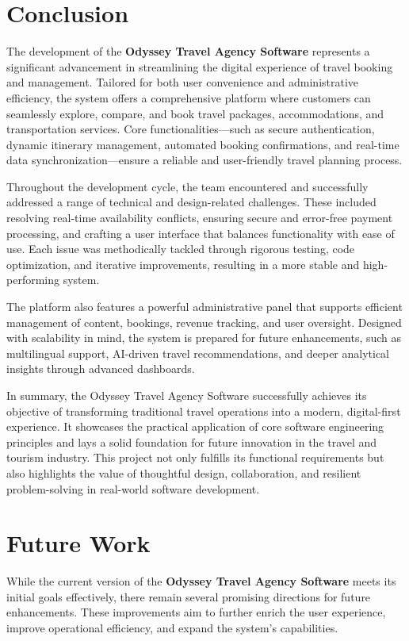 \section{Conclusion}
The development of the \textbf{Odyssey Travel Agency Software} represents a significant advancement in streamlining the digital experience of travel booking and management. Tailored for both user convenience and administrative efficiency, the system offers a comprehensive platform where customers can seamlessly explore, compare, and book travel packages, accommodations, and transportation services. Core functionalities—such as secure authentication, dynamic itinerary management, automated booking confirmations, and real-time data synchronization—ensure a reliable and user-friendly travel planning process.

Throughout the development cycle, the team encountered and successfully addressed a range of technical and design-related challenges. These included resolving real-time availability conflicts, ensuring secure and error-free payment processing, and crafting a user interface that balances functionality with ease of use. Each issue was methodically tackled through rigorous testing, code optimization, and iterative improvements, resulting in a more stable and high-performing system.

The platform also features a powerful administrative panel that supports efficient management of content, bookings, revenue tracking, and user oversight. Designed with scalability in mind, the system is prepared for future enhancements, such as multilingual support, AI-driven travel recommendations, and deeper analytical insights through advanced dashboards.

In summary, the Odyssey Travel Agency Software successfully achieves its objective of transforming traditional travel operations into a modern, digital-first experience. It showcases the practical application of core software engineering principles and lays a solid foundation for future innovation in the travel and tourism industry. This project not only fulfills its functional requirements but also highlights the value of thoughtful design, collaboration, and resilient problem-solving in real-world software development.

\section{Future Work}
While the current version of the \textbf{Odyssey Travel Agency Software} meets its initial goals effectively, there remain several promising directions for future enhancements. These improvements aim to further enrich the user experience, improve operational efficiency, and expand the system’s capabilities.

